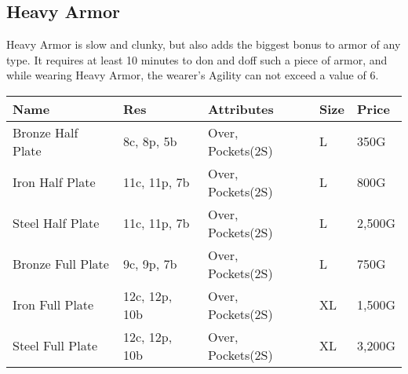\subsection{Heavy Armor}\label{subsec:heavyArmor}
Heavy Armor is slow and clunky, but also adds the biggest bonus to armor of any type.
It requires at least 10 minutes to don and doff such a piece of armor, and while wearing Heavy Armor, the wearer's Agility can not exceed a value of 6.
\begin{longtable}{p{3cm} | p{1.5cm} | p{5cm} | p{1cm} | p{1.5cm}}
	Name & Res &  Attributes & Size & Price\\ \hline
	Bronze Half Plate & 8c, 8p, 5b & Over, Pockets(2S) & L & 350G\\
	
	Iron Half Plate  & 11c, 11p, 7b & Over, Pockets(2S) & L & 800G\\

	Steel Half Plate  & 11c, 11p, 7b & Over, Pockets(2S) & L & 2,500G\\

	Bronze Full Plate & 9c, 9p, 7b & Over, Pockets(2S) & L & 750G\\

	Iron Full Plate  & 12c, 12p, 10b & Over, Pockets(2S) & XL & 1,500G\\

	Steel Full Plate  & 12c, 12p, 10b & Over, Pockets(2S) & XL & 3,200G\\
\end{longtable}